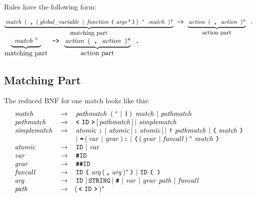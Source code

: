 \documentclass[11pt,a4paper]{article}
\begin{document}
Rules have the following form:
{
\newcommand{\nt}[1]{\,\mbox{\emph{#1}}\,}
\newcommand{\tok}[1]{\,\mbox{\texttt{\textbf{#1}}}\,}
\newcommand{\id}{\,\mbox{\texttt{ID}}\,}
\newcommand{\BAR}{\,|\,}
\begin{center}

$\underbrace{\mbox{\nt{match} ( \tok{,}
    (\nt{global\_variable} \textbar\ \nt{function}\tok{(}\nt{args}*\tok{)})
    \tok{\^} \nt{match} )*}}_{\mbox{matching part}} \mbox{\ \tok{->}\ }
\underbrace{\mbox{\nt{action} ( \tok{,} \nt{action} )*}}_{\mbox{action
    part}} \mbox{\ \tok{.}}$
\fi
$\underbrace{\rule[-.5ex]{0pt}{1ex}\ \nt{match}^{+}\ }_{\mbox{matching part}} \mbox{\ \tok{->}\ }
\underbrace{\mbox{\nt{action} ( \tok{,} \nt{action} )*}}_{\mbox{action
    part}} \mbox{\ \tok{.}}$
\end{center}

\subsection{Matching Part}
\label{matching_part}
The reduced BNF for one match looks like this:
\[
\begin{array}{lcl}
\nt{match} & \rightarrow &
  \nt{pathmatch}\ (\tok{\^{}} \BAR  \tok{|} )\  \nt{match} \BAR
  \nt{pathmatch}\\
\nt{pathmatch} & \rightarrow &
  \tok{<} \id \tok{>} [ \nt{pathmatch} ] \BAR \nt{simplematch}\\
\nt{simplematch} & \rightarrow &
  \nt{atomic} \tok{:} \BAR
  \nt{atomic} [ \tok{:} \nt{atomic} ] \BAR
  \tok{!} \nt{pathmatch} \BAR
  \tok{(} \nt{match} \tok{)}\\
& & \BAR \tok{=} ( \nt{var} \BAR \nt{gvar} ) \tok{:} \BAR
    \tok{(} ( \nt{gvar} \BAR \nt{funcall} ) \tok{\~} \nt{match} \tok{)}\\
\nt{atomic} & \rightarrow & \id \BAR \nt{var}\\
\nt{var} & \rightarrow & \tok{\#}\!\!\id \\
\nt{gvar}  & \rightarrow & \tok{\#\#}\!\!\id \\
\nt{funcall} & \rightarrow &
  \id \tok{(} \nt{arg} (\tok{,} \nt{arg})^{*} \tok{)} \BAR
  \id \tok{( )} \\
\nt{arg} & \rightarrow &
  \id \BAR \mbox{\texttt{STRING}} \BAR \tok{\#} \BAR \nt{var}
  \BAR \nt{gvar} \nt{path} \BAR \nt{funcall}\\
\nt{path} & \rightarrow & (\tok{<} \id \tok{>})^{*}\\
\end{array}
\]

}
\end{document}
